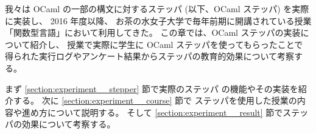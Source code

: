 
我々は OCaml の一部の構文に対するステッパ (以下、OCaml ステッパ) を実際に実装し、
2016 年度以降、
お茶の水女子大学で毎年前期に開講されている授業「関数型言語」において利用してきた。
この章では、OCaml ステッパの実装について紹介し、
授業で実際に学生に OCaml ステッパを使ってもらったことで
得られた実行ログやアンケート結果からステッパの教育的効果について考察する。

まず \ref{section:experiment__stepper} 節で実際のステッパ
の機能やその実装を紹介する。
次に \ref{section:experiment__course} 節で
ステッパを使用した授業の内容や進め方について説明する。
そして \ref{section:experiment__result} 節でステッパの効果について考察する。
